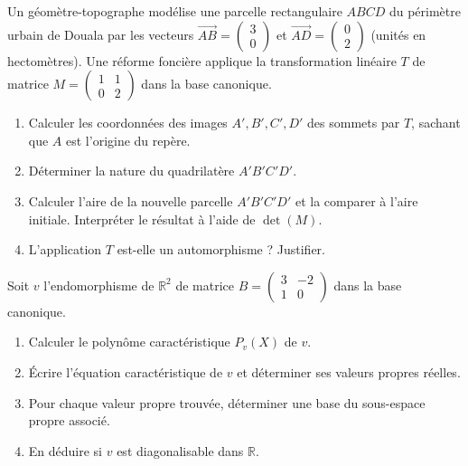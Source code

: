 \documentclass[11pt]{article}
\begin{document}
\begin{exercice}
Un géomètre-topographe modélise une parcelle rectangulaire $ABCD$ du périmètre urbain de Douala par les vecteurs $\vec{AB} = \begin{pmatrix} 3 \\ 0 \end{pmatrix}$ et $\vec{AD} = \begin{pmatrix} 0 \\ 2 \end{pmatrix}$ (unités en hectomètres). Une réforme foncière applique la transformation linéaire $T$ de matrice $M = \begin{pmatrix} 1 & 1 \\ 0 & 2 \end{pmatrix}$ dans la base canonique.
\begin{enumerate}
    \item Calculer les coordonnées des images $A', B', C', D'$ des sommets par $T$, sachant que $A$ est l'origine du repère.
    \item Déterminer la nature du quadrilatère $A'B'C'D'$.
    \item Calculer l'aire de la nouvelle parcelle $A'B'C'D'$ et la comparer à l'aire initiale. Interpréter le résultat à l'aide de $\det(M)$.
    \item L'application $T$ est-elle un automorphisme ? Justifier.
\end{enumerate}
\end{exercice}

\begin{exercice}
Soit $v$ l'endomorphisme de $\mathbb{R}^2$ de matrice $B = \begin{pmatrix} 3 & -2 \\ 1 & 0 \end{pmatrix}$ dans la base canonique.
\begin{enumerate}
    \item Calculer le polynôme caractéristique $P_v(X)$ de $v$.
    \item Écrire l'équation caractéristique de $v$ et déterminer ses valeurs propres réelles.
    \item Pour chaque valeur propre trouvée, déterminer une base du sous-espace propre associé.
    \item En déduire si $v$ est diagonalisable dans $\mathbb{R}$.
\end{enumerate}
\end{exercice}
\end{document}
